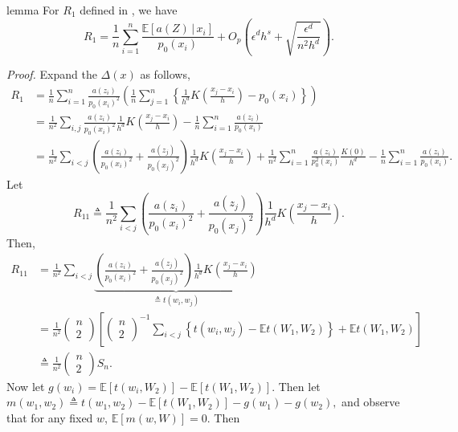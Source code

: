 \documentclass[11pt]{article}
\begin{document}
\begin{restatable}{lemma}{} \label{lemma: remainder term}
    For $R_1$ defined in , we have
    \[R_1 = \frac{1}{n}\sum_{i = 1}^n \frac{\mathbb{E}[a(Z)\,| \,x_i]}{p_0(x_i)} + O_p\left( \epsilon^dh^s + \sqrt{\frac{\epsilon^d}{n^2h^d}}\right).\]
\end{restatable}
\noindent \textit{Proof.} Expand the $\Delta(x)$ as follows,
\begin{align*}
    R_1&= \frac{1}{n}\sum_{i = 1}^n \frac{a(z_i)}{p_0(x_i)^2}\left(\frac{1}{n}\sum_{j = 1}^n\left\{\frac{1}{h^d}K\left(\frac{x_j - x_i}{h}\right) - p_0(x_i)\right\}\right) \\
    &= \frac{1}{n^2}\sum_{i, j} \frac{a(z_i)}{p_0(x_i)^2} \frac{1}{h^d}K\left(\frac{x_j - x_i}{h}\right) - \frac{1}{n}\sum_{i = 1}^n \frac{a(z_i)}{p_0(x_i)} \\
    &= \frac{1}{n^2} \sum_{i < j} \left(\frac{a(z_i)}{p_0(x_i)^2} + \frac{a(z_j)}{p_0(x_j)^2}\right)\frac{1}{h^d}K\left(\frac{x_j - x_i}{h}\right) + \frac{1}{n^2}\sum_{i = 1}^n\frac{a(z_i)}{p_0^2(x_i)}\frac{K(0)}{h^d} - \frac{1}{n}\sum_{i = 1}^n \frac{a(z_i)}{p_0(x_i)}.
\end{align*}
Let 
\[R_{11} \triangleq \frac{1}{n^2} \sum_{i < j} \left(\frac{a(z_i)}{p_0(x_i)^2} + \frac{a(z_j)}{p_0(x_j)^2}\right)\frac{1}{h^d}K\left(\frac{x_j - x_i}{h}\right).\]
Then, 
\begin{align*}
    R_{11} &= \frac{1}{n^2} \sum_{i < j} \underbrace{\left(\frac{a(z_i)}{p_0(x_i)^2} + \frac{a(z_j)}{p_0(x_j)^2}\right)\frac{1}{h^d}K\left(\frac{x_j - x_i}{h}\right)}_{\triangleq t(w_i, w_j)} \\
    &= \frac{1}{n^2} \begin{pmatrix}
        n \\ 
        2
    \end{pmatrix} \left[\begin{pmatrix}
        n \\2
    \end{pmatrix}^{-1}\sum_{i < j}\left\{t(w_i, w_j) - \mathbb{E} t(W_1, W_2)\right\} + \mathbb{E}t(W_1 , W_2 )\right] \\
    &\triangleq \frac{1}{n^2}\begin{pmatrix}
        n \\
        2
    \end{pmatrix} S_n. 
\end{align*}
Now let $g(w_i) = \mathbb{E}[t(w_i, W_2)] - \mathbb{E}[t(W_1, W_2)]$. Then let $m(w_1, w_2) \triangleq t(w_1, w_2) - \mathbb{E}[t(W_1, W_2)] - g(w_1) - g(w_2), $ and observe that for any fixed $w$, $\mathbb{E}[m(w, W)] = 0.$ Then
\end{document}
